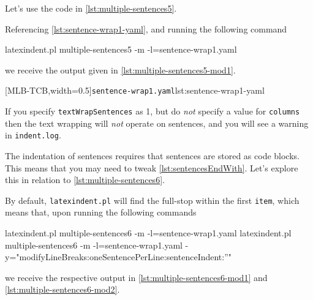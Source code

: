  Let's use the code in \cref{lst:multiple-sentences5}.


 Referencing \cref{lst:sentence-wrap1-yaml}, and running the following command
  
 \begin{commandshell}
latexindent.pl multiple-sentences5 -m -l=sentence-wrap1.yaml
\end{commandshell}
 we receive the output given in \cref{lst:multiple-sentences5-mod1}.

 \begin{cmhtcbraster}[ raster left skip=-3.5cm,
   raster right skip=-2cm,
   raster force size=false,
   raster column 1/.style={add to width=.1\textwidth},
   raster column skip=.06\linewidth]
  [MLB-TCB,width=0.5\textwidth]{\texttt{sentence-wrap1.yaml}}{lst:sentence-wrap1-yaml}
 \end{cmhtcbraster}

 If you specify \texttt{textWrapSentences} as 1, but do \emph{not} specify a value for
 \texttt{columns} then the text wrapping will \emph{not} operate on sentences, and you
 will see a warning in \texttt{indent.log}.

 The indentation of sentences requires that sentences are stored as code blocks. This
 means that you may need to tweak \vref{lst:sentencesEndWith}. Let's explore this in
 relation to \cref{lst:multiple-sentences6}.


 By default, \texttt{latexindent.pl} will find the full-stop within the first
 \texttt{item}, which means that, upon running the following commands   
 \begin{commandshell}
latexindent.pl multiple-sentences6 -m -l=sentence-wrap1.yaml 
latexindent.pl multiple-sentences6 -m -l=sentence-wrap1.yaml -y="modifyLineBreaks:oneSentencePerLine:sentenceIndent:''"
\end{commandshell}
 we receive the respective output in \cref{lst:multiple-sentences6-mod1} and
 \cref{lst:multiple-sentences6-mod2}.

